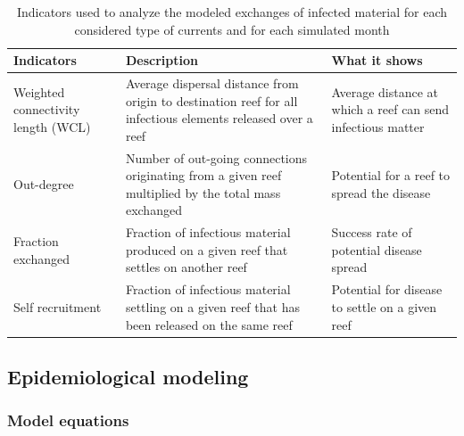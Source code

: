\documentclass[utf8]{frontiersSCNS}
\begin{document}
\begin{table}
    \centering
    \begin{tabular}{|p{4cm}|p{5cm}|p{4cm}|}
        \hline
        \textbf{Indicators} & \textbf{Description} & \textbf{What it shows} \\
        \hline
            Weighted connectivity length (WCL) & 
            Average dispersal distance from origin to destination reef for all infectious elements released over a reef & 
            Average distance at which a reef can send infectious matter \\
        \hline
            Out-degree &
            Number of out-going connections originating from a given reef multiplied by the total mass exchanged  &
            Potential for a reef to spread the disease \\
        \hline
            Fraction exchanged &
            Fraction of infectious material produced on a given reef that settles on another reef &
            Success rate of potential disease spread  \\
        \hline
            Self recruitment &
            Fraction of infectious material settling on a given reef that has been released on the same reef &
            Potential for disease to settle on a given reef \\
        \hline            
    \end{tabular}
    \caption{Indicators used to analyze the modeled exchanges of infected material for each considered type of currents and for each simulated month}
    \label{tab:indicator}
\end{table}

\subsection{Epidemiological modeling}

\subsubsection{Model equations}
\end{document}
